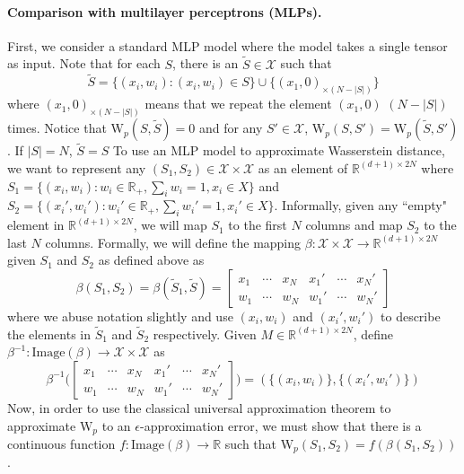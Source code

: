 \documentclass[12pt]{article}
\newcommand{\R}{\mathbb R}
\begin{document}
\paragraph{Comparison with multilayer perceptrons (MLPs).} 
First, we consider a standard MLP model where the model takes a single tensor as input. 
 Note that for each $S$, there is an $\tilde{S} \in \mathcal{X}$ such that 
\begin{equation*}
   \tilde{S} = \{(x_i, w_i) : (x_i, w_i) \in S\} \cup \{(x_1, 0)_{\times (N- |S|)}\}
\end{equation*}
where $(x_1, 0)_{\times(N - |S|)}$ means that we repeat the element $(x_1, 0)$ $(N - |S|)$ times. Notice that $\mathrm{W}_p(S, \tilde{S}) = 0$ and for any $S' \in \mathcal{X}$, $\mathrm{W}_p(S, S') = \mathrm{W}_p(\tilde{S}, S')$. If $|S|=N$, $\tilde{S} = S$
To use an MLP model to approximate Wasserstein distance, we want to represent any $(S_1, S_2) \in \mathcal{X} \times \mathcal{X}$ as an element of $\R^{(d + 1) \times 2N}$ where $S_1 = \{(x_i, w_i): w_i \in \R_+, \sum_i w_i = 1, x_i \in X\}$ and $S_2 = \{(x_i', w_i'): w_i' \in \R_+, \sum_i w_i' = 1, x_i' \in X\}$. 
Informally, given any ``empty" element in $\R^{(d + 1) \times 2N}$, we will map $S_1$ to the first $N$ columns and map $S_2$ to the last $N$ columns. 
Formally, we will define the mapping $\beta: \mathcal{X} \times \mathcal{X} \to \R^{(d + 1) \times 2N}$ given $S_1$ and $S_2$ as defined above as 
\begin{equation*}
    \beta(S_1, S_2) = \beta(\tilde{S}_1, \tilde{S}) = \begin{bmatrix}
        x_1 & \cdots & x_N & x_1' & \cdots & x_N' \\
        w_1 & \cdots & w_N & w_1' & \cdots & w_N'
    \end{bmatrix}
\end{equation*}
where we abuse notation slightly and use $(x_i, w_i)$ and $(x_i', w_i')$ to describe the elements in $\tilde{S}_1$ and $\tilde{S}_2$ respectively. Given $M \in \R^{(d + 1) \times 2N}$, define $\beta^{-1}: \mathrm{Image}(\beta) \to \mathcal{X} \times \mathcal{X}$ as
\begin{equation*}
    \beta^{-1}\Bigg(\begin{bmatrix}
        x_1 & \cdots & x_N & x_1' & \cdots & x_N' \\
        w_1 & \cdots & w_N & w_1' & \cdots & w_N'
    \end{bmatrix} \Bigg) = (\{(x_i, w_i)\}, \{(x_i', w_i')\})
\end{equation*}
Now, in order to use the classical universal approximation theorem to approximate $\mathrm{W}_p$ to an $\epsilon$-approximation error, we must show that there is a continuous function $f:\mathrm{Image}(\beta) \to \R$ such that $\mathrm{W}_p(S_1, S_2) = f(\beta(S_1, S_2))$. 
\end{document}
